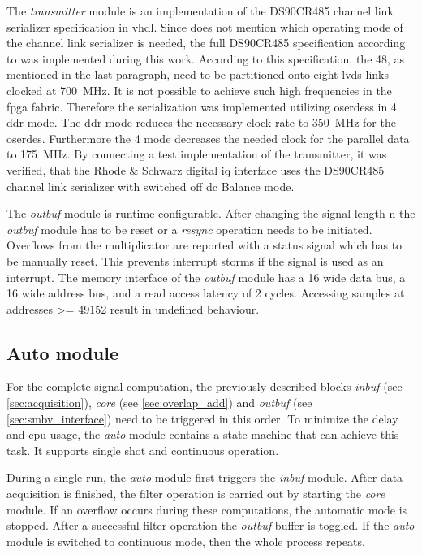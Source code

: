 \documentclass[12pt,a4paper,parskip=full,abstract=true,BCOR=12mm,twoside,open=right]{scrreprt}
\def\device#1{\mbox{\textit{#1}}}
\begin{document}
The \device{transmitter} module is an implementation of the DS90CR485 channel
link serializer specification in \gls{vhdl}. Since \cite{fsq_b17} does not
mention which operating mode of the channel link serializer is needed, the
full DS90CR485 specification according to \cite{ds90cr485} was implemented during this work.
According to this specification, the \SI{48}{\bit}, as mentioned in the last
paragraph, need to be partitioned onto eight \gls{lvds} links clocked at
\SI{700}{\mega\hertz}. It is not possible to achieve such high frequencies
in the \gls{fpga} fabric. Therefore the serialization was implemented utilizing
\glspl{oserdes} in \SI{4}{\bit} \gls{ddr} mode. The \gls{ddr} mode reduces the
necessary clock rate to \SI{350}{\mega\hertz} for the \gls{oserdes}. Furthermore the
\SI{4}{\bit} mode decreases the needed clock for the parallel data to
\SI{175}{\mega\hertz}. By connecting a test implementation of the transmitter,
it was verified, that the Rhode \& Schwarz digital \gls{iq} interface uses the
DS90CR485 channel link serializer with switched off \gls{dc} Balance mode.

The \device{outbuf} module is runtime configurable. After changing the signal
length \gls{n} the \device{outbuf} module has to be reset or a \device{resync} operation
needs to be initiated. Overflows from the multiplicator are reported with a status
signal which has to be manually reset. This prevents interrupt storms if the signal is
used as an interrupt. The memory interface of the \device{outbuf}
module has a \SI{16}{\bit} wide data bus, a \SI{16}{\bit} wide address bus, and a read access
latency of 2 cycles. Accessing samples at addresses \num{>= 49152} result in undefined behaviour.


\subsection{Auto module}
\label{sec:auto}

For the complete signal computation, the previously described blocks
\device{inbuf} (see \cref{sec:acquisition}), \device{core} (see
\cref{sec:overlap_add}) and \device{outbuf} (see \cref{sec:smbv_interface})
need to be triggered in this order. To minimize the delay and \gls{cpu}
usage, the \device{auto} module contains a state machine that can achieve
this task. It supports single shot and continuous operation.

During a single run, the \device{auto} module first triggers the \device{inbuf}
module. After data acquisition is finished, the filter operation is carried out
by starting the \device{core} module. If an overflow occurs during these
computations, the automatic mode is stopped. After a successful filter
operation the \device{outbuf} buffer is toggled. If the \device{auto} module
is switched to continuous mode, then the whole process repeats.
\end{document}
